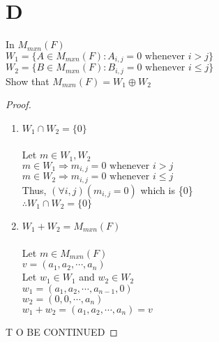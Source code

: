 \documentclass[11pt]{scrartcl}
\begin{document}
\section{D}
In $M_{mxn}(F)$\\
$W_1 = \{A\in M_{mxn}(F): A_{i,j} = 0 \text{ whenever }i>j\}$\\
$W_2 = \{B\in M_{mxn}(F): B_{i,j} = 0 \text{ whenever }i \leq j\}$\\
Show that $M_{mxn}(F) = W_1 \oplus W_2$
\begin{proof}
\-\
\begin{enumerate}[label=\alph*.]
	\item{
			$W_1 \cap W_2 = \{0\}$\\
			\-\\ Let $m \in W_1, W_2$\\
			$m \in W_1 \Rightarrow m_{i,j} = 0 \text{ whenever }i>j$\\
			$m \in W_2 \Rightarrow m_{i,j} = 0 \text{ whenever }i \leq j$\\
			Thus, $(\forall i,j)(m_{i,j} = 0)$ which is \{0\}\\
			$\therefore W_1 \cap W_2 = \{0\}$\\
		}	
	\item{
			$W_1 + W_2 = M_{mxn}(F)$\\
			\-\\ Let $m \in M_{mxn}(F)$\\
			$v = (a_1, a_2, \cdots, a_n)$\\
			Let $w_1 \in W_1$ and $w_2 \in W_2$\\
			$w_1 = (a_1, a_2, \cdots, a_{n-1}, 0)$\\
			$w_2 = (0, 0, \cdots, a_n)$\\
			$w_1 + w_2 = (a_1, a_2, \cdots, a_n) = v$\\
		}	
\end{enumerate}
T O BE CONTINUED 
\end{proof}
\end{document}
